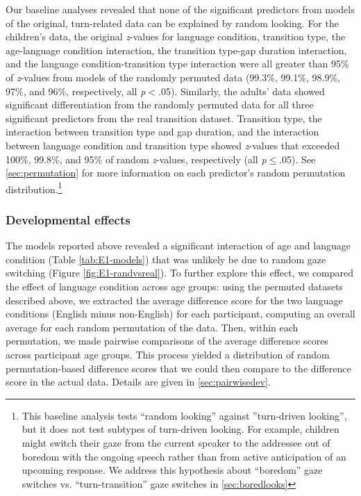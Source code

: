 \documentclass[authoryear, 12pt]{elsarticle}
\begin{document}
Our baseline analyses revealed that none of the significant predictors from models of the original, turn-related data can be explained by random looking. For the children's data, the original \textit{z}-values for language condition, transition type, the age-language condition interaction, the transition type-gap duration interaction, and the language condition-transition type interaction were all greater than 95\% of \textit{z}-values from models of the randomly permuted data (99.3\%, 99.1\%, 98.9\%, 97\%, and 96\%, respectively, all \textit{p}$<$.05). Similarly, the adults' data showed significant differentiation from the randomly permuted data for all three significant predictors from the real transition dataset. Transition type, the interaction between transition type and gap duration, and the interaction between language condition and transition type showed \textit{z}-values that exceeded 100\%, 99.8\%, and 95\% of random \textit{z}-values, respectively (all \textit{p}$\leq$.05). See \ref{sec:permutation} for more information on each predictor's random permutation distribution.\footnote{This baseline analysis tests ``random looking'' against ''turn-driven looking'', but it does not test subtypes of turn-driven looking. For example, children might switch their gaze from the current speaker to the addressee out of boredom with the ongoing speech rather than from active anticipation of an upcoming response. We address this hypothesis about ``boredom'' gaze switches vs. ``turn-transition'' gaze switches in \ref{sec:boredlooks}}


\subsubsection*{Developmental effects}

The models reported above revealed a significant interaction of age and language condition (Table \ref{tab:E1-models}) that was unlikely be due to random gaze switching (Figure \ref{fig:E1-randvsreal}). To further explore this effect, we compared the effect of language condition across age groups: using the permuted datasets described above, we extracted the average difference score for the two language conditions (English minus non-English) for each participant, computing an overall average for each random permutation of the data. Then, within each permutation, we made pairwise comparisons of the average difference scores across participant age groups. This process yielded a distribution of random permutation-based difference scores that we could then compare to the difference score in the actual data. Details are given in \ref{sec:pairwisedev}.
\end{document}
